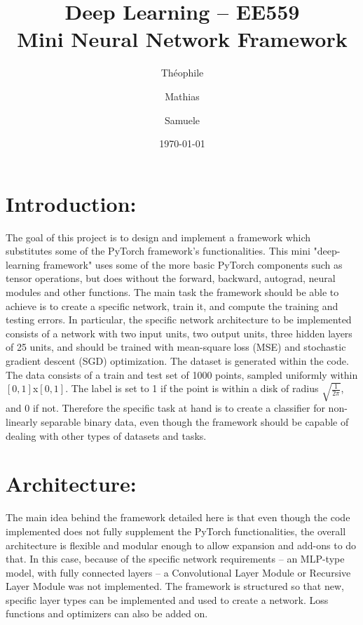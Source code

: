 \documentclass[10pt, a4paper]{article}
\begin{document}
\title{\large{\textbf{Deep Learning -- EE559 \\ Mini Neural Network Framework}}}
\date{\normalsize{\today}}
\author{\normalsize{Th\' eophile 	} \and \normalsize{Mathias } \and \normalsize{Samuele }}
\maketitle
\section{Introduction:} 
The goal of this project is to design and implement a framework which substitutes some of the PyTorch framework's functionalities. This mini "deep-learning framework" uses some of the more basic PyTorch components such as tensor operations, but does without the forward, backward, autograd, neural modules and other functions. 
The main task the framework should be able to achieve is to create a specific network, train it, and compute the training and testing errors.
In particular, the specific network architecture to be implemented consists of a network with two input units, two output units, three hidden layers of 25 units, and should be trained with mean-square loss (MSE) and stochastic gradient descent (SGD) optimization.
The dataset is generated within the code. The data consists of a train and test set of 1000 points, sampled uniformly within $[0,1]$x$[0,1]$. The label is set to 1 if the point is within a disk of radius $\sqrt{\frac{1}{2\pi}}$, and 0 if not. Therefore the specific task at hand is to create a classifier for non-linearly separable binary data, even though the framework should be capable of dealing with other types of datasets and tasks.
	
\section{Architecture:}The main idea behind the framework detailed here is that even though the code implemented does not fully supplement the PyTorch functionalities, the overall architecture is flexible and modular enough to allow expansion and add-ons to do that. In this case, because of 	the specific network requirements -- an MLP-type model, with fully connected layers -- a Convolutional Layer Module or Recursive Layer Module was not implemented. The framework is structured so that new, specific layer types can be implemented and used to create a network. Loss functions and optimizers can also be added on.
\end{document}
